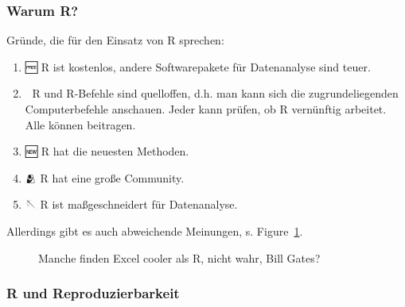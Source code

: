 \documentclass[
  letterpaper,
  DIV=11,
  numbers=noendperiod]{scrartcl}
\theoremstyle{definition}
\theoremstyle{definition}
\theoremstyle{definition}
\theoremstyle{remark}
\begin{document}
\subsubsection{Warum R?}\label{warum-r}

Gründe, die für den Einsatz von R sprechen:

\begin{enumerate}
\def\labelenumi{\arabic{enumi}.}
\item
  🆓 R ist kostenlos, andere Softwarepakete für Datenanalyse sind teuer.
  💸
\item
  📖 R und R-Befehle sind quelloffen, d.h. man kann sich die
  zugrundeliegenden Computerbefehle anschauen. Jeder kann prüfen, ob R
  vernünftig arbeitet. Alle können beitragen.
\item
  🆕 R hat die neuesten Methoden.
\item
  🫂 R hat eine große Community.
\item
  🪡 R ist maßgeschneidert für Datenanalyse.
\end{enumerate}

Allerdings gibt es auch abweichende Meinungen, s.
Figure~\ref{fig-bill-excel}.

\begin{figure}


\caption{\label{fig-bill-excel}Manche finden Excel cooler als R, nicht
wahr, Bill Gates?}

\end{figure}%

\subsubsection{R und Reproduzierbarkeit}\label{r-und-reproduzierbarkeit}
\end{document}

